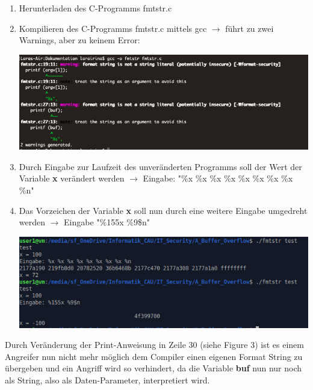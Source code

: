 \documentclass[12pt,a4paper]{article}
\begin{document}
	\begin{enumerate}
		\item Herunterladen des C-Programms fmtstr.c
		\item Kompilieren des C-Programms fmtstr.c mittels gcc $\rightarrow$ führt zu zwei Warnings, aber zu keinem Error:
			\begin{center}
			\includegraphics[scale=0.3]{compilation.png}
			\end{center}
		\item Durch Eingabe zur Laufzeit des unveränderten Programms soll der Wert der Variable \textbf{x} verändert werden  $\rightarrow$ Eingabe: "\%x \%x \%x \%x \%x \%x \%x \%x \%n"
		\item Das Vorzeichen der Variable \textbf{x} soll nun durch eine weitere Eingabe umgedreht werden $\rightarrow$ Eingabe "\%155x \%9\$n"
		\begin{center}
		\includegraphics[scale=0.3]{Teil2.png}
		\end{center}
	\end{enumerate}

	Durch Veränderung der Print-Anweisung in Zeile 30 (siehe Figure 3) ist es einem Angreifer nun nicht mehr möglich dem Compiler einen eigenen Format String zu übergeben und ein Angriff wird so verhindert, da die Variable \textbf{buf} nun nur noch als String, also als Daten-Parameter, interpretiert wird.
\end{document}
